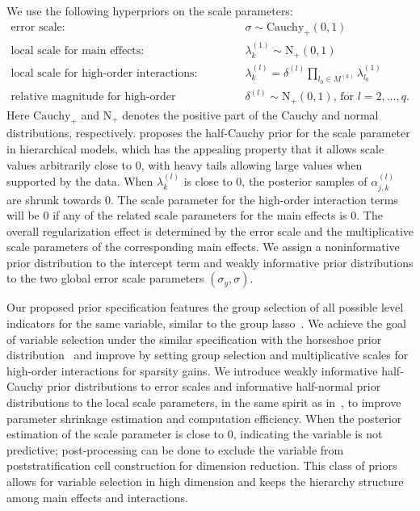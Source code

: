 \documentclass[11pt]{article}
\begin{document}
We use the following hyperpriors on the scale parameters:
\begin{align}
\label{main}
	\nonumber  \mbox{error scale: }&\sigma \sim  \textrm{Cauchy}_{+}(0,1) \\ 
	\nonumber \mbox{local scale for main effects: } & \lambda_k^{(1)} \sim  \textrm{N}_{+}(0,1)\\
	 \mbox{local scale for high-order interactions: } & \lambda^{(l)}_k=\delta^{(l)}\prod_{l_0\in M^{(k)}}\lambda^{(1)}_{l_0} \\
	\nonumber  \mbox{relative magnitude for high-order interactions: }&\delta^{(l)}  \sim   \textrm{N}_{+}(0,1) \mbox{, for } l=2,\dots, q.
\end{align}
Here $\textrm{Cauchy}_{+}$ and $\textrm{N}_{+}$ denotes the positive part of the Cauchy and normal distributions, respectively.
\cite{gelman06-prior} proposes the half-Cauchy prior for the scale parameter in hierarchical models, which has the appealing property that it allows scale values arbitrarily close to 0, with heavy tails allowing large values when supported by the data. When $\lambda_k^{(l)}$ is close to 0, the posterior samples of $\alpha_{j,k}^{(l)}$ are shrunk towards 0. The scale parameter for the high-order interaction terms will be 0 if any of the related scale parameters for the main effects is 0. The overall regularization effect is determined by the error scale and the multiplicative scale parameters of the corresponding main effects. We assign a noninformative prior distribution to the intercept term and weakly informative prior distributions to the two global error scale parameters $(\sigma_y, \sigma)$.


Our proposed prior specification features the group selection of all possible level indicators for the same variable, similar to the group lasso~\citep{grouplasso06}. We achieve the goal of variable selection under the similar specification with the horseshoe prior distribution~\citep{horseshoe10} and improve by setting group selection and multiplicative scales for high-order interactions for sparsity gains. We introduce weakly informative half-Cauchy prior distributions to error scales and informative half-normal prior distributions to the local scale parameters, in the same spirit as in~\cite{hyperprior:Aki16}, to improve parameter shrinkage estimation and computation efficiency. When the posterior estimation of the scale parameter is close to 0, indicating the variable is not predictive; post-processing can be done to exclude the variable from poststratification cell construction for dimension reduction. This class of priors allows for variable selection in high dimension and keeps the hierarchy structure among main effects and interactions.
 
\end{document}
